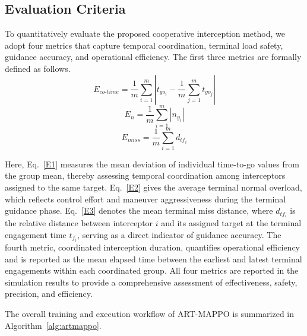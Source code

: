 \documentclass[lettersize,journal]{IEEEtran}
\begin{document}
\subsection{Evaluation Criteria}
\label{subsec:eval}

To quantitatively evaluate the proposed cooperative interception method, we adopt four metrics that capture temporal coordination, terminal load safety, guidance accuracy, and operational efficiency. The first three metrics are formally defined as follows.
\begin{equation}
\label{E1}
E_{co\text{-}time} = \frac{1}{m}\sum_{i=1}^{m} \left| t_{go_i} - \frac{1}{m}\sum_{j=1}^{m} t_{go_j} \right|
\end{equation}
\begin{equation}
\label{E2}
E_{n} = \frac{1}{m}\sum_{i=1}^{m} |n_{y_i}|
\end{equation}
\begin{equation}
\label{E3}
E_{miss} = \frac{1}{m}\sum_{i=1}^{m} d_{tf_i}
\end{equation}

Here, Eq.~\eqref{E1} measures the mean deviation of individual time-to-go values from the group mean, thereby assessing temporal coordination among interceptors assigned to the same target. Eq.~\eqref{E2} gives the average terminal normal overload, which reflects control effort and maneuver aggressiveness during the terminal guidance phase. Eq.~\eqref{E3} denotes the mean terminal miss distance, where $d_{tf_i}$ is the relative distance between interceptor $i$ and its assigned target at the terminal engagement time $t_{f_i}$, serving as a direct indicator of guidance accuracy. The fourth metric, coordinated interception duration, quantifies operational efficiency and is reported as the mean elapsed time between the earliest and latest terminal engagements within each coordinated group. All four metrics are reported in the simulation results to provide a comprehensive assessment of effectiveness, safety, precision, and efficiency.

The overall training and execution workflow of ART-MAPPO is summarized in
Algorithm~\ref{alg:artmappo}.
\end{document}
